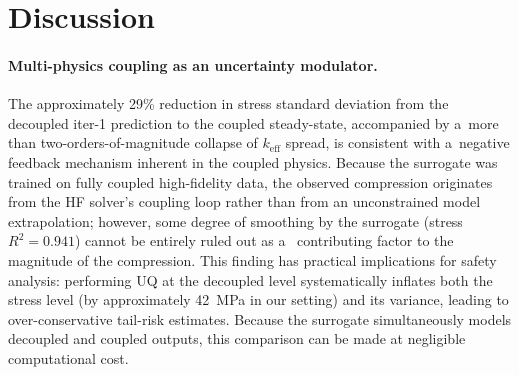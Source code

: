 \documentclass[pdflatex,sn-mathphys-num]{sn-jnl}
\theoremstyle{thmstyleone}
\theoremstyle{thmstyletwo}
\theoremstyle{thmstylethree}
\begin{document}
\section{Discussion}\label{sec:discussion}


\paragraph{Multi-physics coupling as an uncertainty modulator.}
The approximately 29\% reduction in stress standard deviation from the decoupled
iter-1 prediction to the coupled steady-state, accompanied by a~more than
two-orders-of-magnitude collapse of $k_{\mathrm{eff}}$ spread, is consistent with
a~negative feedback mechanism inherent in the coupled physics.
Because the surrogate was trained on fully coupled high-fidelity data, the
observed compression originates from the HF solver's coupling loop rather than
from an unconstrained model extrapolation; however, some degree of smoothing by
the surrogate (stress $R^2 = 0.941$) cannot be entirely ruled out as a~
contributing factor to the magnitude of the compression.
This finding has practical implications for safety analysis: performing UQ at
the decoupled level systematically inflates both the stress level (by
approximately \SI{42}{MPa} in our setting) and its variance, leading to
over-conservative tail-risk estimates.
Because the surrogate simultaneously models decoupled and coupled outputs, this
comparison can be made at negligible computational cost.
\end{document}
